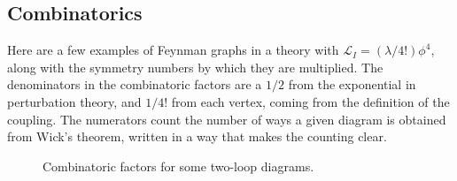 \subsection{Combinatorics}

Here are a few examples of Feynman graphs in a theory with
\(\mathcal{L}_I=(\lambda/4!)\phi^4\), along with the symmetry numbers by which they
are multiplied. The denominators in the combinatoric factors are a \(1/2\) from the
exponential in perturbation theory, and \(1/4!\) from each vertex, coming from the
definition of the coupling. The numerators count the number of ways a given diagram
is obtained from Wick's theorem, written in a way that makes the counting clear.

\begin{figure}[htbp]
  \centering
  \BanksDCombinatoricFigure
  \caption{Combinatoric factors for some two-loop diagrams.}
  \label{fig:D.1}
\end{figure}
